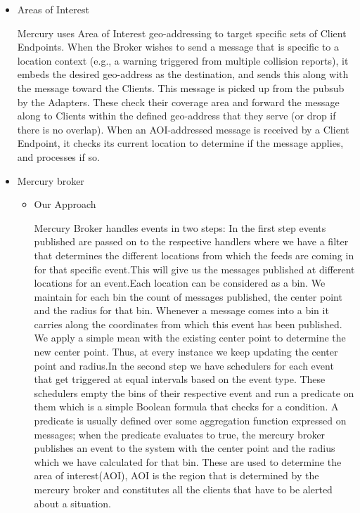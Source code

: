 \begin{itemize}
\item Areas of Interest

Mercury uses Area of Interest geo-addressing to target specific sets
of Client Endpoints.  When the Broker wishes to send a message that is
specific to a location context (e.g., a warning triggered from
multiple collision reports), it embeds the desired geo-address as the
destination, and sends this along with the message toward the
Clients. This message is picked up from the pubsub by the Adapters.
These check their coverage area and forward the message along to
Clients within the defined geo-address that they serve (or drop if
there is no overlap).  When an AOI-addressed message is received by a
Client Endpoint, it checks its current location to determine if the
message applies, and processes if so.

\item Mercury broker
  \begin{itemize}
  \item Our Approach
  
  Mercury Broker handles events in two steps: In the first step events
  published are passed on to the respective handlers where we have a
  filter that determines the different locations from which the feeds
  are coming in for that specific event.This will give us the messages
  published at different locations for an event.Each location can be
  considered as a bin. We maintain for each bin the count of messages
  published, the center point and the radius for that bin.  Whenever a
  message comes into a bin it carries along the coordinates from which
  this event has been published. We apply a simple mean with the
  existing center point to determine the new center point. Thus, at
  every instance we keep updating the center point and radius.In the
  second step we have schedulers for each event that get triggered at
  equal intervals based on the event type.  These schedulers empty the
  bins of their respective event and run a predicate on them which is
  a simple Boolean formula that checks for a condition.  A predicate
  is usually defined over some aggregation function expressed on
  messages; when the predicate evaluates to true, the mercury broker
  publishes an event to the system with the center point and the
  radius which we have calculated for that bin. These are used to
  determine the area of interest(AOI), AOI is the region that is
  determined by the mercury broker and constitutes all the clients
  that have to be alerted about a situation.


\end{itemize}
\end{itemize}
